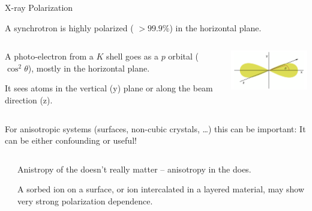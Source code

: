 \begin{slide}{X-ray Polarization}

  \begin{cenpage}{125mm}

    A synchrotron is highly polarized ( $ > 99.9\% $) in the horizontal  plane.

\begin{columns}[T]
\begin{column}{65mm}

    \vmm

    A photo-electron from a $K$ shell goes as a $p$ orbital ($\cos^2\theta
    $), mostly in the horizontal plane.
    \vmm

    It {} sees atoms in the vertical (y) plane or along the
    beam direction (z).

  \end{column}
  \begin{column}{55mm}
    \includegraphics[width=53mm]{figs/theory/dipole}
  \end{column}
  \end{columns}


  For anisotropic systems (surfaces, non-cubic crystals, \ldots) this can
  be important:  It can be either confounding or useful!

  \vmm\vmm

  \begin{columns}
    \begin{column}{20mm}

     \end{column}
     \begin{column}{75mm}
       Anistropy of the {} doesn't really matter
       -- anisotropy in the {} does.

       \vmm

       A sorbed ion on a surface, or ion intercalated in a layered
       material, may show very strong polarization dependence.

     \end{column}
 \end{columns}

 \end{cenpage}

\vfill
\end{slide}
